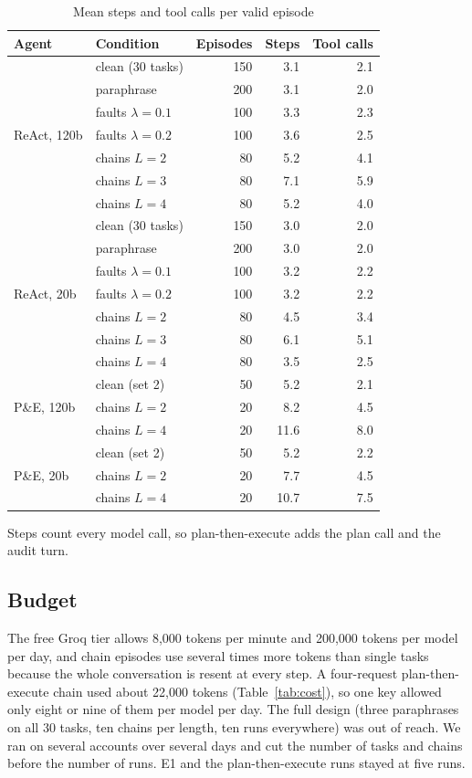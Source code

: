 \documentclass[10pt,a4paper,twocolumn]{article}
\begin{document}
\begin{table}[t]
\caption{Mean steps and tool calls per valid episode}\label{tab:effort}
\centering\small
\begin{tabular}{@{}llrrr@{}}
\toprule
Agent & Condition & Episodes & Steps & Tool calls\\
\midrule
\multirow{7}{*}{ReAct, 120b} & clean (30 tasks) & 150 & 3.1 & 2.1\\
 & paraphrase & 200 & 3.1 & 2.0\\
 & faults $\lambda=0.1$ & 100 & 3.3 & 2.3\\
 & faults $\lambda=0.2$ & 100 & 3.6 & 2.5\\
 & chains $L=2$ & 80 & 5.2 & 4.1\\
 & chains $L=3$ & 80 & 7.1 & 5.9\\
 & chains $L=4$ & 80 & 5.2 & 4.0\\
\midrule
\multirow{7}{*}{ReAct, 20b} & clean (30 tasks) & 150 & 3.0 & 2.0\\
 & paraphrase & 200 & 3.0 & 2.0\\
 & faults $\lambda=0.1$ & 100 & 3.2 & 2.2\\
 & faults $\lambda=0.2$ & 100 & 3.2 & 2.2\\
 & chains $L=2$ & 80 & 4.5 & 3.4\\
 & chains $L=3$ & 80 & 6.1 & 5.1\\
 & chains $L=4$ & 80 & 3.5 & 2.5\\
\midrule
\multirow{3}{*}{P\&E, 120b} & clean (set 2) & 50 & 5.2 & 2.1\\
 & chains $L=2$ & 20 & 8.2 & 4.5\\
 & chains $L=4$ & 20 & 11.6 & 8.0\\
\midrule
\multirow{3}{*}{P\&E, 20b} & clean (set 2) & 50 & 5.2 & 2.2\\
 & chains $L=2$ & 20 & 7.7 & 4.5\\
 & chains $L=4$ & 20 & 10.7 & 7.5\\
\bottomrule
\end{tabular}

\smallskip
\footnotesize Steps count every model call, so plan-then-execute adds the plan call and the audit turn.
\end{table}

\subsection{Budget}
The free Groq tier allows 8,000 tokens per minute and 200,000 tokens per model per day, and chain episodes use several
times more tokens than single tasks because the whole conversation is resent at every step. A four-request
plan-then-execute chain used about 22,000 tokens (Table~\ref{tab:cost}), so one key allowed only eight or nine of them
per model per day. The full design (three paraphrases on all 30 tasks, ten chains per length, ten runs everywhere) was
out of reach. We ran on several accounts over several days and cut the number of tasks and chains before the number of
runs. E1 and the plan-then-execute runs stayed at five runs.
\end{document}
